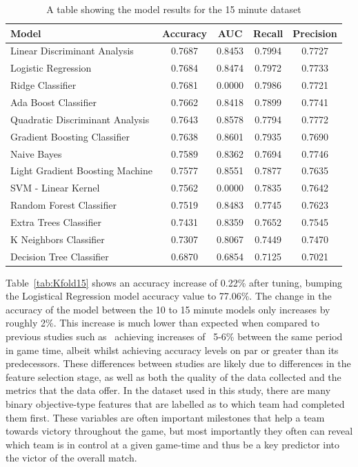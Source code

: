 \begin{table}[h]
    \centering
    \begin{tabular}{l c c c c }
        \toprule
        \textbf{Model} & \textbf{Accuracy} & \textbf{AUC} & \textbf{Recall} & \textbf{Precision} \\
        \midrule
        Linear Discriminant Analysis & 0.7687 & 0.8453 & 0.7994 & 0.7727 \\
        Logistic Regression & 0.7684 & 0.8474 & 0.7972 & 0.7733  \\
        Ridge Classifier & 0.7681 & 0.0000 & 0.7986 & 0.7721  \\
        Ada Boost Classifier & 0.7662 & 0.8418 & 0.7899 & 0.7741   \\
        Quadratic Discriminant Analysis & 0.7643 & 0.8578 & 0.7794 & 0.7772  \\
        Gradient Boosting Classifier & 0.7638 & 0.8601 & 0.7935 & 0.7690  \\
        Naive Bayes & 0.7589 & 0.8362 & 0.7694 & 0.7746  \\
        Light Gradient Boosting Machine & 0.7577 & 0.8551 & 0.7877 & 0.7635  \\
        SVM - Linear Kernel & 0.7562 & 0.0000 & 0.7835 & 0.7642 \\
        Random Forest Classifier & 0.7519 & 0.8483 & 0.7745 & 0.7623  \\
        Extra Trees Classifier & 0.7431 & 0.8359 & 0.7652 & 0.7545  \\
        K Neighbors Classifier & 0.7307 & 0.8067 & 0.7449 & 0.7470  \\
        Decision Tree Classifier & 0.6870 & 0.6854 & 0.7125 & 0.7021  \\
        \bottomrule
    \end{tabular}
    \caption{A table showing the model results for the 15 minute dataset}
    \label{tab:ModelResults15}
\end{table}

Table~\ref{tab:Kfold15} shows an accuracy increase of 0.22\% after tuning, bumping the Logistical Regression model accuracy value to 77.06\%.
The change in the accuracy of the model between the 10 to 15 minute models only increases by roughly 2\%.
This increase is much lower than expected when compared to previous studies such as~\citet{silva2018continuous, lee2020predicting} achieving increases of ~5-6\% between the same period in game time, albeit whilst achieving accuracy levels on par or greater than its predecessors.
These differences between studies are likely due to differences in the feature selection stage, as well as both the quality of the data collected and the metrics that the data offer.
In the dataset used in this study, there are many binary objective-type features that are labelled as to which team had completed them first.
These variables are often important milestones that help a team towards victory throughout the game, but most importantly they often can reveal which team is in control at a given game-time and thus be a key predictor into the victor of the overall match. \\


